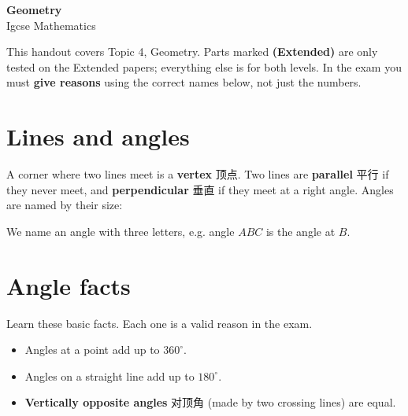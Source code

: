 \documentclass[11pt]{article}
\begin{document}
\begin{center}
  {\LARGE\bfseries Geometry}\\[0.35em]
  {\large Igcse Mathematics}
\end{center}
\vspace{0.6em}

This handout covers Topic 4, Geometry. Parts marked \textbf{(Extended)} are only tested on the Extended papers; everything else is for both levels. In the exam you must \textbf{give reasons} using the correct names below, not just the numbers.

\section*{Lines and angles}

A corner where two lines meet is a \textbf{vertex} 顶点. Two lines are \textbf{parallel} 平行 if they never meet, and \textbf{perpendicular} 垂直 if they meet at a right angle. Angles are named by their size:

\begin{center}
\end{center}

We name an angle with three letters, e.g. angle $ABC$ is the angle at $B$.

\section*{Angle facts}

Learn these basic facts. Each one is a valid reason in the exam.

\begin{itemize}
\item Angles at a point add up to $360^{\circ}$.

\item Angles on a straight line add up to $180^{\circ}$.

\item \textbf{Vertically opposite angles} 对顶角 (made by two crossing lines) are equal.

\end{itemize}
\end{document}
